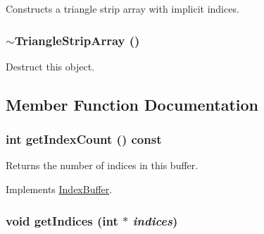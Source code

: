 Constructs a triangle strip array with implicit indices. \hypertarget{classm3g_1_1TriangleStripArray_1cb3853bf79b7710d57044da818d2cde}{
\subsubsection[{$\sim$TriangleStripArray}]{\setlength{\rightskip}{0pt plus 5cm}$\sim${\bf TriangleStripArray} ()}}
\label{classm3g_1_1TriangleStripArray_1cb3853bf79b7710d57044da818d2cde}


Destruct this object. 

\subsection{Member Function Documentation}
\hypertarget{classm3g_1_1TriangleStripArray_fe9ae2993ebcdb93d5ff26d57c81b73e}{
\subsubsection[{getIndexCount}]{\setlength{\rightskip}{0pt plus 5cm}int getIndexCount () const}}
\label{classm3g_1_1TriangleStripArray_fe9ae2993ebcdb93d5ff26d57c81b73e}


Returns the number of indices in this buffer. 

Implements \hyperlink{classm3g_1_1IndexBuffer_ac7d2c37f177b21195a81f00061ef94e}{IndexBuffer}.\hypertarget{classm3g_1_1TriangleStripArray_650953afac45099025a524ab160b911f}{
\subsubsection[{getIndices}]{\setlength{\rightskip}{0pt plus 5cm}void getIndices (int $\ast$ {\em indices})}}
\label{classm3g_1_1TriangleStripArray_650953afac45099025a524ab160b911f}


